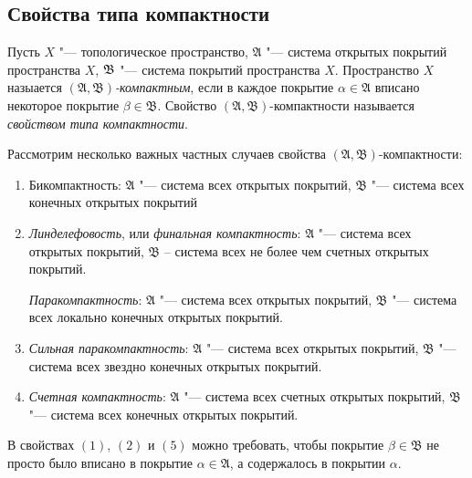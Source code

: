 \subsection{Свойства типа компактности}

\begin{definition}
    Пусть $X$ "--- топологическое пространство, $\mathfrak{A}$ "--- система открытых покрытий пространства $X$, $\mathfrak B$ "--- система покрытий пространства $X$. Пространство $X$ назыается \textit{$(\mathfrak{A},\mathfrak{B})$-компактным}, если в каждое покрытие $\alpha\in\mathfrak{A}$ вписано некоторое покрытие $\beta \in \mathfrak{B}$. Свойство $(\mathfrak{A},\mathfrak{B})$-компактности называется \textit{свойством типа компактности}.
\end{definition}

\begin{example}
    Рассмотрим несколько важных частных случаев свойства $(\mathfrak{A},\mathfrak{B})$-компактности:
    \begin{enumerate}
        \item Бикомпактность: $\mathfrak{A}$ "--- система всех открытых покрытий, $\mathfrak{B}$ "--- система всех конечных открытых покрытий
        
        \item \textit{Линделефовость}, или \textit{финальная компактность}: $\mathfrak{A}$ "--- система всех открытых покрытий, $\mathfrak{B}$ -- система всех не более чем счетных открытых покрытий.
        
        \ite \textit{Паракомпактность}: $\mathfrak{A}$ "--- система всех открытых покрытий, $\mathfrak{B}$ "--- система всех локально конечных открытых покрытий.
        
        \item \textit{Сильная паракомпактность}: $\mathfrak{A}$ "--- система всех открытых покрытий, $\mathfrak{B}$ "--- система всех звездно конечных открытых покрытий.

        \item \textit{Счетная компактность}: $\mathfrak{A}$ "--- система всех счетных открытых покрытий, $\mathfrak{B}$ "--- система всех конечных открытых покрытий.
    \end{enumerate}
\end{example}

\begin{note}
    В свойствах $(1)$, $(2)$ и $(5)$ можно требовать, чтобы покрытие $\beta\in\mathfrak{B}$ не просто было вписано в покрытие $\alpha\in\mathfrak{A}$, а содержалось в покрытии $\alpha$.
\end{note}

